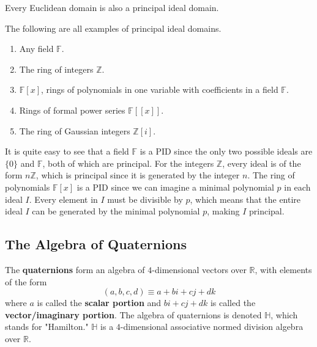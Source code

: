     \begin{proposition}
      Every Euclidean domain is also a principal ideal domain. 
    \end{proposition}

    \begin{example}
      The following are all examples of principal ideal domains. 
      \begin{enumerate}
        \item Any field $\mathbb{F}$. 
        \item The ring of integers $\mathbb{Z}$. 
        \item $\mathbb{F}[x]$, rings of polynomials in one variable with coefficients in a field $\mathbb{F}$. 
        \item Rings of formal power series $\mathbb{F}[[x]]$. 
        \item The ring of Gaussian integers $\mathbb{Z}[i]$. 
      \end{enumerate}
    \end{example}

    It is quite easy to see that a field $\mathbb{F}$ is a PID since the only two possible ideals are $\{0\}$ and $\mathbb{F}$, both of which are principal. For the integers $\mathbb{Z}$, every ideal is of the form $n\mathbb{Z}$, which is principal since it is generated by the integer $n$. The ring of polynomials $\mathbb{F}[x]$ is a PID since we can imagine a minimal polynomial $p$ in each ideal $I$. Every element in $I$ must be divisible by $p$, which means that the entire ideal $I$ can be generated by the minimal polynomial $p$, making $I$ principal. 

  \subsection{The Algebra of Quaternions}

    \begin{definition}
      The \textbf{quaternions} form an algebra of $4$-dimensional vectors over $\mathbb{R}$, with elements of the form
      \begin{equation}
        (a, b, c, d) \equiv a + bi + cj + dk
      \end{equation}
      where $a$ is called the \textbf{scalar portion} and $bi + cj + dk$ is called the \textbf{vector/imaginary portion}. The algebra of quaternions is denoted $\mathbb{H}$, which stands for "Hamilton." $\mathbb{H}$ is a $4$-dimensional associative normed division algebra over $\mathbb{R}$. 
    \end{definition}

